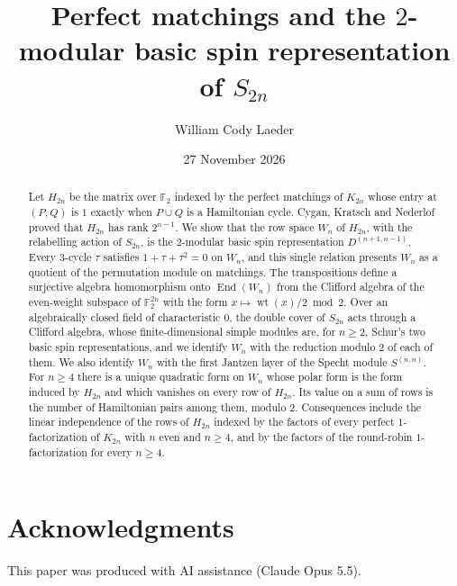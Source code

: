 \documentclass[11pt]{amsart}
\title{Perfect matchings and the $2$-modular basic spin representation of $S_{2n}$}
\author{William Cody Laeder}
\date{27 November 2026}
\numberwithin{equation}{section}
\theoremstyle{definition}
\theoremstyle{remark}
\newcommand{\F}{\mathbb{F}_2}
\newcommand{\End}{\operatorname{End}}
\newcommand{\wt}{\operatorname{wt}}
\begin{document}
\begin{abstract}
Let $H_{2n}$ be the matrix over $\F$ indexed by the perfect matchings of $K_{2n}$ whose entry at $(P,Q)$ is $1$ exactly when $P\cup Q$ is a Hamiltonian cycle. Cygan, Kratsch and Nederlof proved that $H_{2n}$ has rank $2^{n-1}$. We show that the row space $W_n$ of $H_{2n}$, with the relabelling action of $S_{2n}$, is the $2$-modular basic spin representation $D^{(n+1,n-1)}$. Every $3$-cycle $\tau$ satisfies $1+\tau+\tau^2=0$ on $W_n$, and this single relation presents $W_n$ as a quotient of the permutation module on matchings. The transpositions define a surjective algebra homomorphism onto $\End(W_n)$ from the Clifford algebra of the even-weight subspace of $\F^{2n}$ with the form $x\mapsto\wt(x)/2\bmod 2$. Over an algebraically closed field of characteristic $0$, the double cover of $S_{2n}$ acts through a Clifford algebra, whose finite-dimensional simple modules are, for $n\ge2$, Schur's two basic spin representations, and we identify $W_n$ with the reduction modulo $2$ of each of them. We also identify $W_n$ with the first Jantzen layer of the Specht module $S^{(n,n)}$. For $n\ge4$ there is a unique quadratic form on $W_n$ whose polar form is the form induced by $H_{2n}$ and which vanishes on every row of $H_{2n}$. Its value on a sum of rows is the number of Hamiltonian pairs among them, modulo $2$. Consequences include the linear independence of the rows of $H_{2n}$ indexed by the factors of every perfect $1$-factorization of $K_{2n}$ with $n$ even and $n\ge4$, and by the factors of the round-robin $1$-factorization for every $n\ge4$.
\end{abstract}

\maketitle










\appendix
\raggedbottom{}


\section*{Acknowledgments}

This paper was produced with AI assistance (Claude Opus 5.5).



\end{document}
